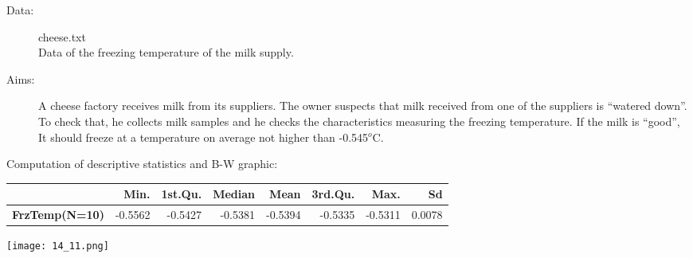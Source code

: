 \begin{frame} 
  \begin{description}
    \item[Data:] cheese.txt\\ 
      Data of the freezing temperature of the milk supply.
    \item[Aims:] \begin{small}A cheese factory receives milk from its suppliers. The owner suspects that milk received from one of the suppliers is ``watered down''. To check that, he collects milk samples and he checks the characteristics measuring the freezing temperature. If the milk is ``good'', It should freeze at a temperature on average not higher than -0.545$^o$C.\end{small}  
      \begin{itemize} \end{itemize}
  \end{description}
\end{frame}

\begin{frame}
  Computation of descriptive statistics and B-W graphic:\\
  \vspace{.3cm}
  \begin{scriptsize}
    \begin{tabular}{|l|rrrrrrr|}
      \hline
      & \textbf{Min}. & 1\textbf{st.Qu}. & \textbf{Median} & \textbf{Mean} & \textbf{3rd.Qu.} & \textbf{Max.} & \textbf{Sd}\\
      \hline
      \textbf{FrzTemp(N=10)} & -0.5562 & -0.5427 & -0.5381 & -0.5394 & -0.5335 & -0.5311 & 0.0078\\
      \hline	
    \end{tabular}
  \end{scriptsize}
  \begin{center}
    \texttt{[image: 14\_11.png]}
  \end{center}
\end{frame}

